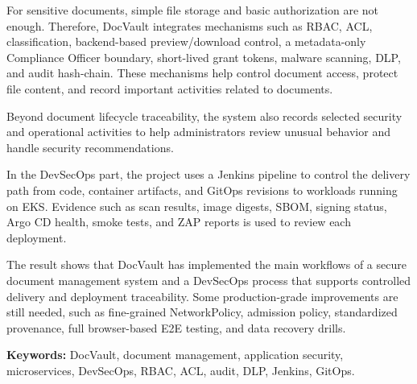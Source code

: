 For sensitive documents, simple file storage and basic authorization are not enough. Therefore, DocVault integrates mechanisms such as RBAC, ACL, classification, backend-based preview/download control, a metadata-only Compliance Officer boundary, short-lived grant tokens, malware scanning, DLP, and audit hash-chain. These mechanisms help control document access, protect file content, and record important activities related to documents.

Beyond document lifecycle traceability, the system also records selected security and operational activities to help administrators review unusual behavior and handle security recommendations.

In the DevSecOps part, the project uses a Jenkins pipeline to control the delivery path from code, container artifacts, and GitOps revisions to workloads running on EKS. Evidence such as scan results, image digests, SBOM, signing status, Argo CD health, smoke tests, and ZAP reports is used to review each deployment.

The result shows that DocVault has implemented the main workflows of a secure document management system and a DevSecOps process that supports controlled delivery and deployment traceability. Some \mbox{production-grade} improvements are still needed, such as fine-grained NetworkPolicy, admission policy, standardized provenance, full \mbox{browser-based} E2E testing, and data recovery drills.

\textbf{Keywords:} DocVault, document management, application security, microservices, DevSecOps, RBAC, ACL, audit, DLP, Jenkins, GitOps.

\clearpage
